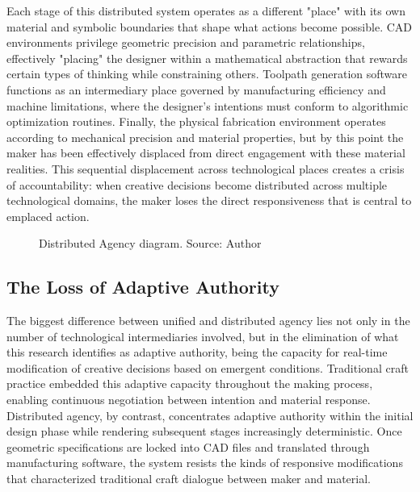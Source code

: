 \vspace{0.5cm}

Each stage of this distributed system operates as a different "place" with its own material and symbolic boundaries that shape what actions become possible. CAD environments privilege geometric precision and parametric relationships, effectively "placing" the designer within a mathematical abstraction that rewards certain types of thinking while constraining others. Toolpath generation software functions as an intermediary place governed by manufacturing efficiency and machine limitations, where the designer's intentions must conform to algorithmic optimization routines. Finally, the physical fabrication environment operates according to mechanical precision and material properties, but by this point the maker has been effectively displaced from direct engagement with these material realities. This sequential displacement across technological places creates a crisis of accountability: when creative decisions become distributed across multiple technological domains, the maker loses the direct responsiveness that is central to emplaced action.

\begin{figure}[H]
\centering
{}
\caption{Distributed Agency diagram. Source: Author}
\label{fig:distributed_agency}
\end{figure}

\subsection{The Loss of Adaptive Authority}

The biggest difference between unified and distributed agency lies not only in the number of technological intermediaries involved, but in the elimination of what this research identifies as adaptive authority, being the capacity for real-time modification of creative decisions based on emergent conditions. Traditional craft practice embedded this adaptive capacity throughout the making process, enabling continuous negotiation between intention and material response. Distributed agency, by contrast, concentrates adaptive authority within the initial design phase while rendering subsequent stages increasingly deterministic. Once geometric specifications are locked into CAD files and translated through manufacturing software, the system resists the kinds of responsive modifications that characterized traditional craft dialogue between maker and material.

